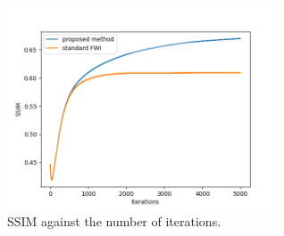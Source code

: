 \begin{figure}[htbp]
\vspace{-\baselineskip}
\begin{center}
    \includegraphics[width=80mm]{public/ssim}
    \caption{SSIM against the number of iterations.}
    \label{fig:ssim}
\end{center}
\vspace{-\baselineskip}
\end{figure}











